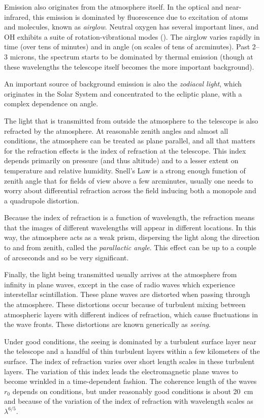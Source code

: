 Emission also originates from the atmosphere itself.  In the optical
and near-infrared, this emission is dominated by fluorescence due to
excitation of atoms and molecules, known as {\it airglow}. Neutral
oxygen has several important lines, and OH exhibits a suite of
rotation-vibrational modes (\citealt{osterbrock96a,
osterbrock97a}). The airglow varies rapidly in time (over tens of
minutes) and in angle (on scales of tens of arcminutes). Past 2--3
microns, the spectrum starts to be dominated by thermal emission
(though at these wavelengths the telescope itself becomes the more
important background).

An important source of background emission is also the {\it zodiacal
light}, which originates in the Solar System and concentrated to the
ecliptic plane, with a complex dependence on angle.

The light that is transmitted from outside the atmosphere to the
telescope is also refracted by the atmosphere. At reasonable zenith
angles and almost all conditions, the atmosphere can be treated as
plane parallel, and all that matters for the refraction effects is the
index of refraction at the telescope. This index depends primarily on
pressure (and thus altitude) and to a lesser extent on temperature and
relative humidity. Snell's Law is a strong enough function of zenith
angle that for fields of view above a few arcminutes, usually one
needs to worry about differential refraction across the field inducing
both a monopole and a quadrupole distortion.

Because the index of refraction is a function of wavelength, the
refraction means that the images of different wavelengths will appear
in different locations. In this way, the atmosphere acts as a weak
prism, dispersing the light along the direction to and from zenith,
called the {\it parallactic angle}. This effect can be up to a couple
of arcseconds and so be very significant.

Finally, the light being transmitted usually arrives at the atmosphere
from infinity in plane waves, except in the case of radio waves which
experience interstellar scintillation. These plane waves are distorted
when passing through the atmosphere. These distortions occur because
of turbulent mixing between atmospheric layers with different indices
of refraction, which cause fluctuations in the wave fronts. These
distortions are known generically as {\it seeing}.

Under good conditions, the seeing is dominated by a turbulent surface
layer near the telescope and a handful of thin turbulent layers within
a few kilometers of the surface. The index of refraction varies over
short length scales in these turbulent layers. The variation of this
index leads the electromagnetic plane waves to become wrinkled in a
time-dependent fashion. The coherence length of the waves $r_0$
depends on conditions, but under reasonably good conditions is about
20~cm and because of the variation of the index of refraction with
wavelength scales as $\lambda^{6/5}$.

